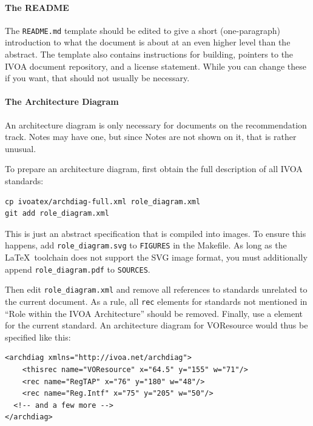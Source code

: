 \documentclass[11pt,a4paper]{ivoa}
\begin{document}
\paragraph{The README}

The \verb|README.md| template should be edited to give a short
(one-paragraph) introduction to what the document is about at an even
higher level than the abstract.  The template also contains instructions
for building, pointers to the IVOA document repository, and a license
statement.  While you can change these if you want, that should not
usually be necessary.


\paragraph{The Architecture Diagram}
\label{sect:archdiag}

An architecture diagram is only
necessary for documents on the recommendation track.  Notes may have
one, but since Notes are not shown on it, that is rather
unusual.

To prepare an architecture diagram, first obtain the full description of
all IVOA standards:

\begin{lstlisting}
cp ivoatex/archdiag-full.xml role_diagram.xml
git add role_diagram.xml
\end{lstlisting}

This is just an abstract specification that is compiled into images.  To
ensure this happens, add \verb|role_diagram.svg| to \verb|FIGURES| in the
Makefile.  As long as the \LaTeX~toolchain does not support the SVG
image format, you must additionally append \verb|role_diagram.pdf| to
\verb|SOURCES|.

Then edit
\texttt{role\_diagram.xml} and remove all references to standards unrelated
to the current document.  As a rule, all \texttt{rec} elements for
standards not mentioned in
``Role within the IVOA Architecture'' should be removed.  Finally, use a
 element for the current standard.  An architecture
diagram for VOResource would thus be specified like this:

\begin{lstlisting}[basicstyle=\footnotesize]
<archdiag xmlns="http://ivoa.net/archdiag">
	<thisrec name="VOResource" x="64.5" y="155" w="71"/>
	<rec name="RegTAP" x="76" y="180" w="48"/>
	<rec name="Reg.Intf" x="75" y="205" w="50"/>
  <!-- and a few more -->
</archdiag>
\end{lstlisting}
\end{document}
